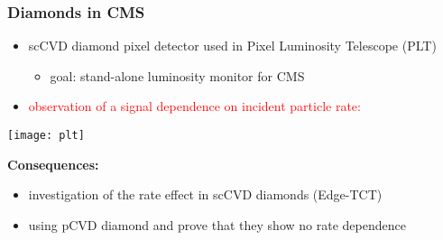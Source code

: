 \begin{frame}
	\frametitle{Diamonds in CMS}
	\begin{itemize}
		\item scCVD diamond pixel detector used in Pixel Luminosity Telescope (PLT)
		\begin{itemize}
			\vspace*{2pt}
			\item goal: stand-alone luminosity monitor for CMS
		\end{itemize}
		\item \textcolor{red}{observation of a signal dependence on incident particle rate:}
	\end{itemize}
	\begin{center}
		\texttt{[image: plt]}
	\end{center}
	\vspace*{-15pt}
	\textbf{Consequences:}
	\begin{itemize}
		\item investigation of the rate effect in scCVD diamonds (Edge-TCT)
		\item using pCVD diamond and prove that they show no rate dependence 
	\end{itemize}
\end{frame}

